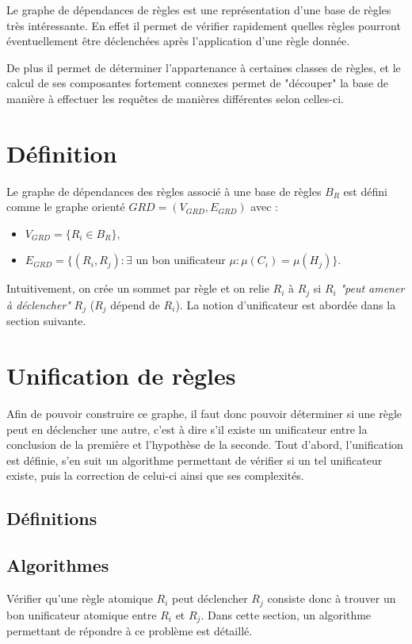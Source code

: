 
Le graphe de dépendances de règles est une représentation d'une base de règles très
intéressante. En effet il permet de vérifier rapidement quelles règles pourront
éventuellement être déclenchées après l'application d'une règle donnée.

De plus il permet de déterminer l'appartenance à certaines classes de règles, et le
calcul de ses composantes fortement connexes permet de "découper" la base de manière à 
effectuer les requêtes de manières différentes selon celles-ci. 


\section{Définition}\label{grd_def}
Le graphe de dépendances des règles associé à une base de règles $B_R$ est défini comme le 
graphe orienté $GRD = (V_{GRD},E_{GRD})$ avec :
\begin{itemize}
	\item $V_{GRD} = \{R_i \in B_R\}$,
	\item $E_{GRD} = \{(R_i,R_j) : \exists$ un bon unificateur $\mu : \mu(C_i) =
	\mu(H_j)\}$.\\ 
\end{itemize}
\par{}
Intuitivement, on crée un sommet par règle et on relie $R_i$ à $R_j$ si $R_i$ {\em "peut
amener à déclencher"} $R_j$ ($R_j$ dépend de $R_i$).
La notion d'unificateur est abordée dans la section suivante.

\section{Unification de règles}\label{grd_unif}

Afin de pouvoir construire ce graphe, il faut donc pouvoir déterminer si une règle peut
en déclencher une autre, c'est à dire s'il existe un unificateur entre la conclusion de
la première et l'hypothèse de la seconde.
Tout d'abord, l'unification est définie, s'en suit un algorithme permettant de vérifier
si un tel unificateur existe, puis la correction de celui-ci ainsi que ses complexités. 

\subsection{Définitions}\label{grd_unif_def}


\subsection{Algorithmes}\label{grd_algo}
	Vérifier qu'une règle atomique $R_i$ peut déclencher $R_j$ consiste donc à trouver un bon
	unificateur atomique entre $R_i$ et $R_j$. Dans cette section, un algorithme
	permettant de répondre à ce problème est détaillé.

